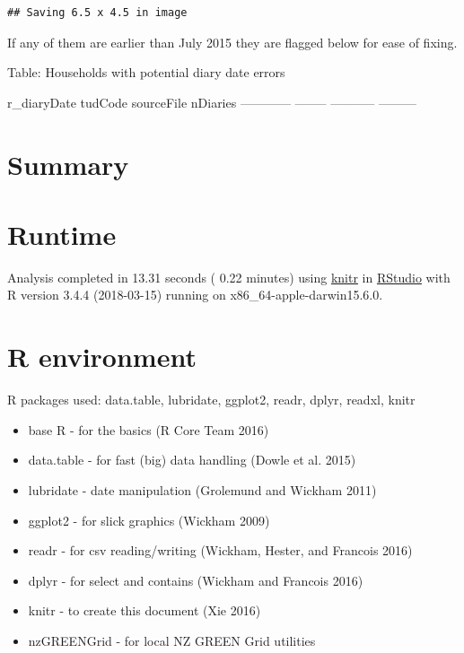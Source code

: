 \documentclass[]{article}
\providecommand{\tightlist}{%
  \setlength{\itemsep}{0pt}\setlength{\parskip}{0pt}}
\begin{document}
\begin{verbatim}
## Saving 6.5 x 4.5 in image
\end{verbatim}

If any of them are earlier than July 2015 they are flagged below for
ease of fixing.

Table: Households with potential diary date errors

r\_diaryDate tudCode sourceFile nDiaries ------------ --------
----------- ---------

\section{Summary}\label{summary}

\section{Runtime}\label{runtime}

Analysis completed in 13.31 seconds ( 0.22 minutes) using
\href{https://cran.r-project.org/package=knitr}{knitr} in
\href{http://www.rstudio.com}{RStudio} with R version 3.4.4 (2018-03-15)
running on x86\_64-apple-darwin15.6.0.

\section{R environment}\label{r-environment}

R packages used: data.table, lubridate, ggplot2, readr, dplyr, readxl,
knitr

\begin{itemize}
\tightlist
\item
  base R - for the basics (R Core Team 2016)
\item
  data.table - for fast (big) data handling (Dowle et al. 2015)
\item
  lubridate - date manipulation (Grolemund and Wickham 2011)
\item
  ggplot2 - for slick graphics (Wickham 2009)
\item
  readr - for csv reading/writing (Wickham, Hester, and Francois 2016)
\item
  dplyr - for select and contains (Wickham and Francois 2016)
\item
  knitr - to create this document (Xie 2016)
\item
  nzGREENGrid - for local NZ GREEN Grid utilities
\end{itemize}
\end{document}

